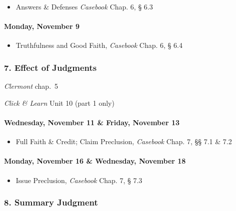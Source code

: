 \documentclass[11pt,letterpaper,twoside]{article}
\providecommand{\tightlist}{%
\setlength{\itemsep}{0em}\setlength{\parskip}{0em}\setlength{\itemindent}{0em}}
\begin{document}
\begin{itemize}
\tightlist
\item
  Answers \& Defenses \emph{Casebook} Chap. 6, § 6.3
\end{itemize}

\paragraph{Monday, November 9}\label{monday-november-9}

\begin{itemize}
\tightlist
\item
  Truthfulness and Good Faith, \emph{Casebook} Chap. 6, § 6.4
\end{itemize}

\subsubsection{7. Effect of Judgments}\label{effect-of-judgments}

\emph{Clermont} chap.~5

\emph{Click \& Learn} Unit 10 (part 1 only)

\paragraph{Wednesday, November 11 \& Friday, November
13}\label{wednesday-november-11-friday-november-13}

\begin{itemize}
\tightlist
\item
  Full Faith \& Credit; Claim Preclusion, \emph{Casebook} Chap. 7, §§
  7.1 \& 7.2
\end{itemize}

\paragraph{Monday, November 16 \& Wednesday, November
18}\label{monday-november-16-wednesday-november-18}

\begin{itemize}
\tightlist
\item
  Issue Preclusion, \emph{Casebook} Chap. 7, § 7.3
\end{itemize}

\subsubsection{8. Summary Judgment}\label{summary-judgment}
\end{document}
